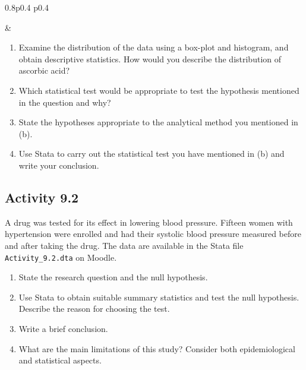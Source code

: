 \documentclass[
]{memoir}
\providecommand{\tightlist}{%
  \setlength{\itemsep}{0pt}\setlength{\parskip}{0pt}}
\begin{document}
\begin{table}[ht]
\begin{centerbox}
\begin{threeparttable}
\begin{tabularx}{0.8\textwidth}{p{} p{}}
\hhline{}

 &
 \tabularnewline[-0.5pt]


\end{tabularx}
\end{threeparttable}\par\end{centerbox}

\end{table}
 

\begin{enumerate}
\def\labelenumi{\alph{enumi})}
\tightlist
\item
  Examine the distribution of the data using a box-plot and histogram, and obtain descriptive statistics. How would you describe the distribution of ascorbic acid?
\item
  Which statistical test would be appropriate to test the hypothesis mentioned in the question and why?
\item
  State the hypotheses appropriate to the analytical method you mentioned in (b).
\item
  Use Stata to carry out the statistical test you have mentioned in (b) and write your conclusion.
\end{enumerate}

\hypertarget{activity-9.2}{%
\subsection*{Activity 9.2}\label{activity-9.2}}

A drug was tested for its effect in lowering blood pressure. Fifteen women with hypertension were enrolled and had their systolic blood pressure measured before and after taking the drug. The data are available in the Stata file \texttt{Activity\_9.2.dta} on Moodle.

\begin{enumerate}
\def\labelenumi{\alph{enumi})}
\tightlist
\item
  State the research question and the null hypothesis.
\item
  Use Stata to obtain suitable summary statistics and test the null hypothesis. Describe the reason for choosing the test.
\item
  Write a brief conclusion.
\item
  What are the main limitations of this study? Consider both epidemiological and statistical aspects.
\end{enumerate}
\end{document}
